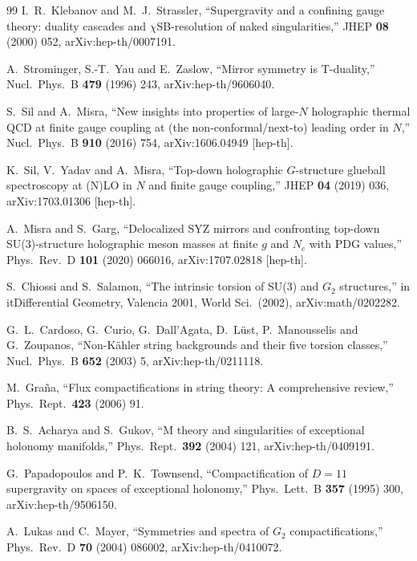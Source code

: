 \documentclass[a4paper,11pt,fleqn]{article}
\theoremstyle{plain}
\theoremstyle{definition}
\begin{document}
\begin{thebibliography}{99}
I.~R.~Klebanov and M.~J.~Strassler,
``Supergravity and a confining gauge theory: duality cascades and $\chi$SB-resolution
of naked singularities,''
JHEP {\bf 08} (2000) 052,
arXiv:hep-th/0007191.

A.~Strominger, S.-T.~Yau and E.~Zaslow,
``Mirror symmetry is T-duality,''
Nucl.\ Phys.\ B {\bf 479} (1996) 243,
arXiv:hep-th/9606040.

S.~Sil and A.~Misra,
``New insights into properties of large-$N$ holographic thermal QCD at finite gauge coupling
at (the non-conformal/next-to) leading order in $N$,''
Nucl.\ Phys.\ B {\bf 910} (2016) 754,
arXiv:1606.04949 [hep-th].

K.~Sil, V.~Yadav and A.~Misra,
``Top-down holographic $G$-structure glueball spectroscopy at (N)LO in $N$ and finite
gauge coupling,''
JHEP {\bf 04} (2019) 036,
arXiv:1703.01306 [hep-th].

A.~Misra and S.~Garg,
``Delocalized SYZ mirrors and confronting top-down SU(3)-structure holographic meson masses
at finite $g$ and $N_c$ with PDG values,''
Phys.\ Rev.\ D {\bf 101} (2020) 066016,
arXiv:1707.02818 [hep-th].

S.~Chiossi and S.~Salamon,
``The intrinsic torsion of SU(3) and $G_2$ structures,''
in it{Differential Geometry, Valencia 2001}, World Sci.\ (2002),
arXiv:math/0202282.

G.~L.~Cardoso, G.~Curio, G.~Dall'Agata, D.~L\"{u}st, P.~Manousselis and G.~Zoupanos,
``Non-K\"{a}hler string backgrounds and their five torsion classes,''
Nucl.\ Phys.\ B {\bf 652} (2003) 5,
arXiv:hep-th/0211118.

M.~Gra\~{n}a,
``Flux compactifications in string theory: A comprehensive review,''
Phys.\ Rept.\ {\bf 423} (2006) 91.

B.~S.~Acharya and S.~Gukov,
``M theory and singularities of exceptional holonomy manifolds,''
Phys.\ Rept.\ {\bf 392} (2004) 121,
arXiv:hep-th/0409191.

G.~Papadopoulos and P.~K.~Townsend,
``Compactification of $D=11$ supergravity on spaces of exceptional holonomy,''
Phys.\ Lett.\ B {\bf 357} (1995) 300,
arXiv:hep-th/9506150.

A.~Lukas and C.~Mayer,
``Symmetries and spectra of $G_2$ compactifications,''
Phys.\ Rev.\ D {\bf 70} (2004) 086002,
arXiv:hep-th/0410072.


\end{thebibliography}
\end{document}
